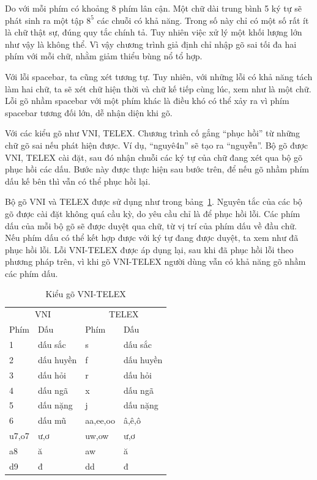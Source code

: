 \documentclass[a4paper,oneside,14pt]{extbook} %
\begin{document}
Do với mỗi phím có khoảng 8 phím lân cận. Một chữ dài trung bình 5 ký
tự sẽ phát sinh ra một tập $8^5$ các chuỗi có khả năng. Trong số này
chỉ có một số rất ít là chữ thật sự, đúng quy tắc chính tả. Tuy nhiên
việc xử lý một khối lượng lớn như vậy là không thể. Vì vậy chương
trình giả định chỉ nhập gõ sai tối đa hai phím với mỗi chữ, nhằm giảm
thiểu bùng nổ tổ hợp.

Với lỗi spacebar, ta cũng xét tương tự. Tuy nhiên, với những lỗi có
khả năng tách làm hai chữ, ta sẽ xét chữ hiện thời và chữ kế tiếp cùng
lúc, xem như là một chữ. Lỗi gõ nhầm spacebar với một phím khác là
điều khó có thể xảy ra vì phím spacebar tương đối lớn, dễ nhận diện
khi gõ.

Với các kiểu gõ như VNI, TELEX. Chương trình cố gắng ``phục hồi'' từ
những chữ gõ sai nếu phát hiện được. Ví dụ, ``nguyê4n'' sẽ tạo ra
``nguyễn''. Bộ gõ được  VNI, TELEX cài đặt, sau đó nhận chuỗi các ký tự
của chữ đang xét qua bộ gõ phục hồi các dấu. Bước này được thực hiện
sau bước trên, để nếu gõ nhầm phím dấu kế bên thì vẫn có thể phục hồi
lại.

Bộ gõ VNI và TELEX được sử dụng như trong
bảng~\ref{tab:vni-telex}. Nguyên tắc của các bộ gõ được cài đặt không
quá cầu kỳ, do yêu cầu chỉ là để phục hồi lỗi. Các phím dấu của mỗi bộ
gõ sẽ được duyệt qua chữ, từ vị trí của phím dấu về đầu chữ. Nếu phím
dấu có thể kết hợp được với ký tự đang được duyệt, ta xem như đã phục
hồi lỗi. Lỗi VNI-TELEX được áp dụng lại, sau khi đã phục hồi lỗi theo
phương pháp trên, vì khi gõ VNI-TELEX người dùng vẫn có khả năng gõ
nhầm các phím dấu.

\begin{table}[htbp]
  \centering
  \begin{tabular}{ll|ll}
    \multicolumn{2}{c}{VNI}&\multicolumn{2}{c}{TELEX}\\
    Phím&Dấu&Phím&Dấu\\\hline
    1&dấu sắc&s&dấu sắc\\
    2&dấu huyền&f&dấu huyền\\
    3&dấu hỏi&r&dấu hỏi\\
    4&dấu ngã&x&dấu ngã\\
    5&dấu nặng&j&dấu nặng\\
    6&dấu mũ&aa,ee,oo&â,ê,ô\\
    u7,o7&ư,ơ&uw,ow&ư,ơ\\
    a8&ă&aw&ă\\
    d9&đ&dd&đ\\
  \end{tabular}
  \caption{Kiểu gõ VNI-TELEX}
  \label{tab:vni-telex}
\end{table}
\end{document}
